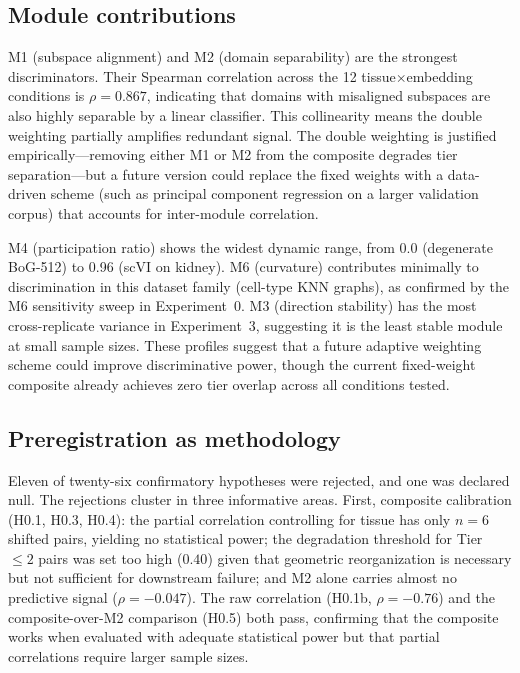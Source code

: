 \documentclass[11pt,letterpaper]{article}
\begin{document}
\subsection{Module contributions}

M1 (subspace alignment) and M2 (domain separability) are the strongest discriminators. Their Spearman correlation across the 12 tissue$\times$embedding conditions is $\rho = 0.867$, indicating that domains with misaligned subspaces are also highly separable by a linear classifier. This collinearity means the double weighting partially amplifies redundant signal. The double weighting is justified empirically---removing either M1 or M2 from the composite degrades tier separation---but a future version could replace the fixed weights with a data-driven scheme (such as principal component regression on a larger validation corpus) that accounts for inter-module correlation.

M4 (participation ratio) shows the widest dynamic range, from 0.0 (degenerate BoG-512) to 0.96 (scVI on kidney). M6 (curvature) contributes minimally to discrimination in this dataset family (cell-type KNN graphs), as confirmed by the M6 sensitivity sweep in Experiment~0. M3 (direction stability) has the most cross-replicate variance in Experiment~3, suggesting it is the least stable module at small sample sizes. These profiles suggest that a future adaptive weighting scheme could improve discriminative power, though the current fixed-weight composite already achieves zero tier overlap across all conditions tested.

\subsection{Preregistration as methodology}

Eleven of twenty-six confirmatory hypotheses were rejected, and one was declared null. The rejections cluster in three informative areas. First, composite calibration (H0.1, H0.3, H0.4): the partial correlation controlling for tissue has only $n = 6$ shifted pairs, yielding no statistical power; the degradation threshold for Tier~$\leq 2$ pairs was set too high ($0.40$) given that geometric reorganization is necessary but not sufficient for downstream failure; and M2 alone carries almost no predictive signal ($\rho = -0.047$). The raw correlation (H0.1b, $\rho = -0.76$) and the composite-over-M2 comparison (H0.5) both pass, confirming that the composite works when evaluated with adequate statistical power but that partial correlations require larger sample sizes.
\end{document}
